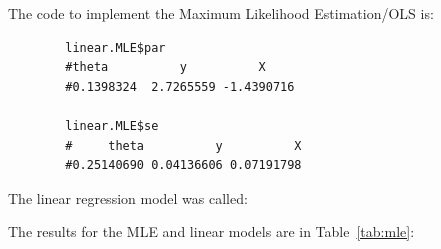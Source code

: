 \documentclass[12pt,letterpaper]{article}
\begin{document}

	\clearpage

	The code to implement the {\huge Maximum Likelihood Estimation/OLS} is:


	\begin{lstlisting}
		linear.MLE$par
		#theta          y          X
		#0.1398324  2.7265559 -1.4390716

		linear.MLE$se
		#     theta          y          X
		#0.25140690 0.04136606 0.07191798
	\end{lstlisting}

	The linear regression model was called:




	The results for the MLE and linear models are in Table~\ref{tab:mle}:
\end{document}
